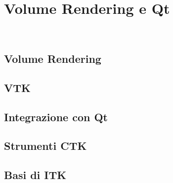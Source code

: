 
\chapter{Volume Rendering e Qt}
\label{cap:teoria-stage}

\\

\section{Volume Rendering}

\section{VTK}

\section{Integrazione con Qt}

\section{Strumenti CTK}

\section{Basi di ITK}

